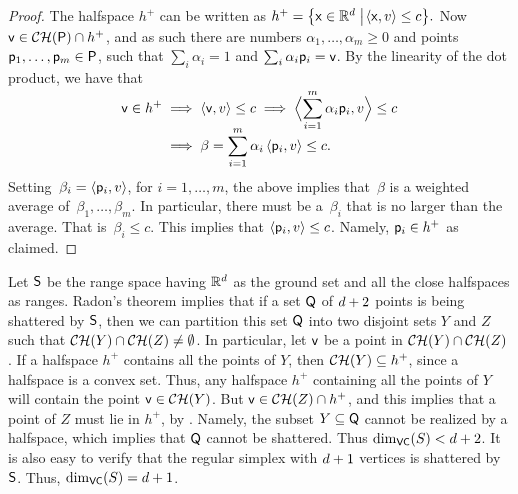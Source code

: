 \begin{proof}
    The halfspace $h^+$ can be written as
    \begin{math}
        h^+ = \left\{  {\mathsf{x}} \in \mathbb{R}^d  \;\middle\vert\; \! \left\langle {{{\mathsf{x}}},{v}} \right\rangle \leq
           c \right\}\!.
    \end{math}
     Now $\pntB \in \CHX{\PntSet} \cap h^+$, and as such
    there are numbers $\alpha_1, \ldots, \alpha_m \geq 0$ and points
    $\mathsf{p}_1,\ldots, \mathsf{p}_m \in {\mathsf{P}}$, such that
    $\sum_i \alpha_i = 1$ and $\sum_i \alpha_i \mathsf{p}_i =\mathsf{v}$. By the
    linearity of the dot product, we have that
    \begin{align*}
        \pntB \in h^+ %
        &\implies%
        \DotProd{\pntB }{v} \leq c%
        \implies%
        \DotProd{\Bigl.\smash{\sum_{i=1}^m \alpha_i \pnt_i }}{v} \leq c%
        \\&
        \implies%
        \beta = \sum_{i=1}^m \alpha_i\DotProd{ \pnt_i }{v} \leq c.        
    \end{align*}
    Setting $\,\beta_i = \left\langle {{ \mathsf{p}_i },{v}} \right\rangle$, for $i=1,\ldots, m$,
    the above implies that $\,\beta$ is a weighted average of
    $\,\beta_1, \ldots, \beta_m$. In particular, there must be a
    $\,\beta_i$ that is no larger than the average. That is
    $\,\beta_i \leq c$. This implies that
    $\left\langle {{ \mathsf{p}_i },{v}} \right\rangle \leq c$. Namely, $\mathsf{p}_i \in h^+$ as
    claimed.
\end{proof}


Let $\mathsf{S}$ be the range space having $\mathbb{R}^d$ as the ground
set and all the close halfspaces as ranges.  Radon's theorem implies
that if a set ${{\mathsf{Q}}}$ of $d + 2$ points is being shattered by
$\mathsf{S}$, then we can partition this set ${{\mathsf{Q}}}$ into two
disjoint sets $Y$ and $Z$ such that $\CHX{Y} \cap \CHX{Z} \ne
\emptyset$. In particular, let $\mathsf{v}$ be a point in $\CHX{Y} \cap
\CHX{Z}$.  If a halfspace $h^+$ contains all the points of $Y$, then
$\CHX{Y} \subseteq h^+$, since a halfspace is a convex set.  Thus, any
halfspace $h^+$ containing all the points of $Y$ will contain the
point $\pntB \in \CHX{Y}$. But $\pntB \in \CHX{Z} \cap h^+$, and this
implies that a point of $Z$ must lie in $h^+$, by
.  Namely, the subset $Y \subseteq
{{\mathsf{Q}}}$ cannot be realized by a halfspace, which implies that
${{\mathsf{Q}}}$ cannot be shattered. Thus $\mathrm{dim}_{\mathsf{VC}}(S) < d+2$. It is also
easy to verify that the regular simplex with $d+1$ vertices is
shattered by $\mathsf{S}$. Thus, $\mathrm{dim}_{\mathsf{VC}}(S) = d+1$.



